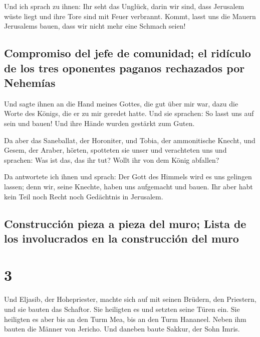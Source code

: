  Und ich sprach zu ihnen: Ihr seht das Unglück, darin wir
sind, dass Jerusalem wüste liegt und ihre Tore sind mit Feuer verbrannt.
Kommt, lasst uns die Mauern Jerusalems bauen, dass wir nicht mehr eine
Schmach seien!

\hypertarget{compromiso-del-jefe-de-comunidad-el-riduxedculo-de-los-tres-oponentes-paganos-rechazados-por-nehemuxedas}{%
\subsection{Compromiso del jefe de comunidad; el ridículo de los tres
oponentes paganos rechazados por
Nehemías}\label{compromiso-del-jefe-de-comunidad-el-riduxedculo-de-los-tres-oponentes-paganos-rechazados-por-nehemuxedas}}

 Und sagte ihnen an die Hand meines Gottes, die gut über
mir war, dazu die Worte des Königs, die er zu mir geredet hatte. Und sie
sprachen: So lasst uns auf sein und bauen! Und ihre Hände wurden
gestärkt zum Guten.

 Da aber das Saneballat, der Horoniter, und Tobia, der
ammonitische Knecht, und Gesem, der Araber, hörten, spotteten sie unser
und verachteten uns und sprachen: Was ist das, das ihr tut? Wollt ihr
von dem König abfallen?

 Da antwortete ich ihnen und sprach: Der Gott des Himmels
wird es uns gelingen lassen; denn wir, seine Knechte, haben uns
aufgemacht und bauen. Ihr aber habt kein Teil noch Recht noch Gedächtnis
in Jerusalem.

\hypertarget{construcciuxf3n-pieza-a-pieza-del-muro-lista-de-los-involucrados-en-la-construcciuxf3n-del-muro}{%
\subsection{Construcción pieza a pieza del muro; Lista de los
involucrados en la construcción del
muro}\label{construcciuxf3n-pieza-a-pieza-del-muro-lista-de-los-involucrados-en-la-construcciuxf3n-del-muro}}

\hypertarget{section-2}{%
\section{3}\label{section-2}}

 Und Eljasib, der Hohepriester, machte sich auf mit seinen
Brüdern, den Priestern, und sie bauten das Schaftor. Sie heiligten es
und setzten seine Türen ein. Sie heiligten es aber bis an den Turm Mea,
bis an den Turm Hananeel.  Neben ihm bauten die Männer von
Jericho. Und daneben baute Sakkur, der Sohn Imris.

